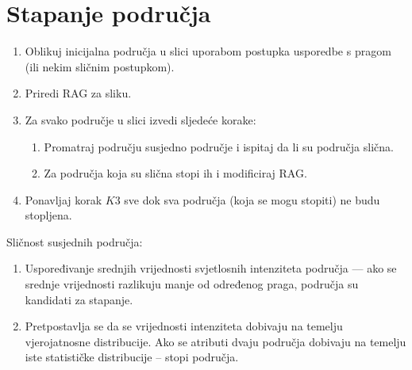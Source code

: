 \documentclass[11pt,english]{article}
\begin{document}
\section{Stapanje područja}
\begin{enumerate}
  \item Oblikuj inicijalna područja u slici uporabom postupka usporedbe s pragom (ili nekim sličnim postupkom).
  \item Priredi RAG za sliku.
  \item Za svako područje u slici izvedi sljedeće korake:
  \begin{enumerate}
    \item Promatraj području susjedno područje i ispitaj da li su područja slična.
    \item Za područja koja su slična stopi ih i modificiraj RAG.
  \end{enumerate}
  \item Ponavljaj korak $K3$ sve dok sva područja (koja se mogu stopiti) ne budu stopljena.
\end{enumerate}
Sličnost susjednih područja:
\begin{enumerate}
  \item Uspoređivanje srednjih vrijednosti svjetlosnih intenziteta područja --- ako se srednje vrijednosti razlikuju manje od određenog praga, područja su kandidati za stapanje.
  \item Pretpostavlja se da se vrijednosti intenziteta dobivaju na temelju vjerojatnosne distribucije. Ako se atributi dvaju područja dobivaju na temelju iste statističke distribucije -- stopi područja.
\end{enumerate}
\end{document}

